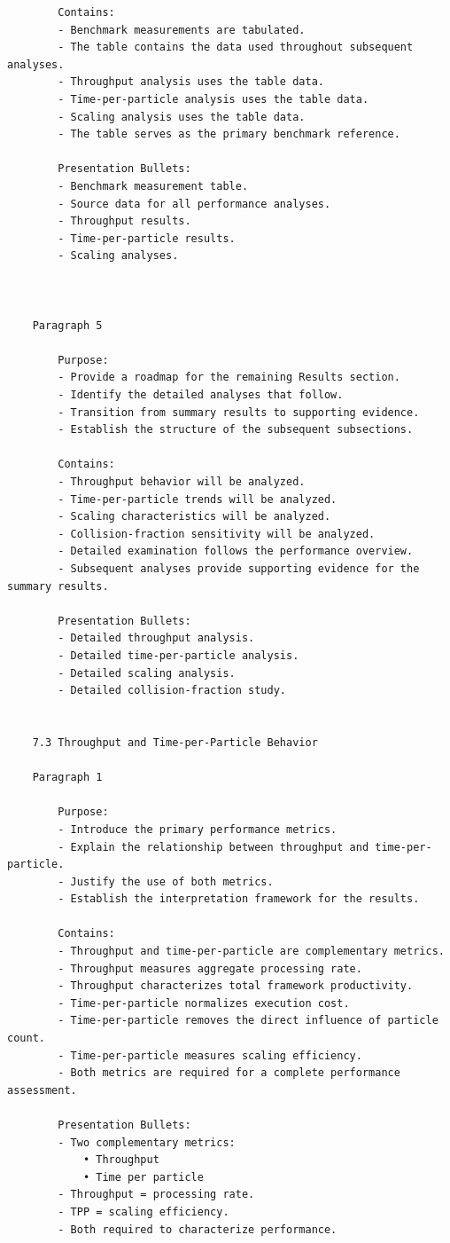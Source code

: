 \begin{verbatim}
		Contains:
		- Benchmark measurements are tabulated.
		- The table contains the data used throughout subsequent analyses.
		- Throughput analysis uses the table data.
		- Time-per-particle analysis uses the table data.
		- Scaling analysis uses the table data.
		- The table serves as the primary benchmark reference.

		Presentation Bullets:
		- Benchmark measurement table.
		- Source data for all performance analyses.
		- Throughput results.
		- Time-per-particle results.
		- Scaling analyses.		
		


	Paragraph 5

		Purpose:
		- Provide a roadmap for the remaining Results section.
		- Identify the detailed analyses that follow.
		- Transition from summary results to supporting evidence.
		- Establish the structure of the subsequent subsections.

		Contains:
		- Throughput behavior will be analyzed.
		- Time-per-particle trends will be analyzed.
		- Scaling characteristics will be analyzed.
		- Collision-fraction sensitivity will be analyzed.
		- Detailed examination follows the performance overview.
		- Subsequent analyses provide supporting evidence for the summary results.

		Presentation Bullets:
		- Detailed throughput analysis.
		- Detailed time-per-particle analysis.
		- Detailed scaling analysis.
		- Detailed collision-fraction study.		
		
		
	7.3 Throughput and Time-per-Particle Behavior

	Paragraph 1

		Purpose:
		- Introduce the primary performance metrics.
		- Explain the relationship between throughput and time-per-particle.
		- Justify the use of both metrics.
		- Establish the interpretation framework for the results.

		Contains:
		- Throughput and time-per-particle are complementary metrics.
		- Throughput measures aggregate processing rate.
		- Throughput characterizes total framework productivity.
		- Time-per-particle normalizes execution cost.
		- Time-per-particle removes the direct influence of particle count.
		- Time-per-particle measures scaling efficiency.
		- Both metrics are required for a complete performance assessment.

		Presentation Bullets:
		- Two complementary metrics:
			• Throughput
			• Time per particle
		- Throughput = processing rate.
		- TPP = scaling efficiency.
		- Both required to characterize performance.		
		

\end{verbatim}
